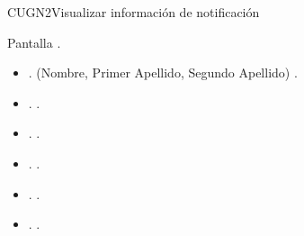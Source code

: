 \begin{UseCase}{CUGN2}{Visualizar información de notificación}
{\begin{UClist}
		\UCli Pantalla .
		\begin{itemize}
			\item {}. (Nombre, Primer Apellido, Segundo Apellido) \ioObtener.
			\item {}. \ioObtener.
			\item {}. \ioObtener.
			\item {}. \ioObtener.
			\item {}. \ioObtener.
			\item {}. \ioObtener.
		\end{itemize}
		
	\end{UClist}
    }
    

\end{UseCase}
